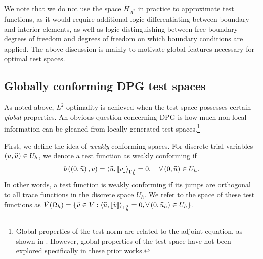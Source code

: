 \begin{remark}
We note that we do not use the space $\tilde{H}_{A^*}$ in practice to approximate test functions, as it would require additional logic differentiating between boundary and interior elements, as well as logic distinguishing between free boundary degrees of freedom and degrees of freedom on which boundary conditions are applied. The above discussion is mainly to motivate global features necessary for optimal test spaces.
\end{remark}

\subsection{Globally conforming DPG test spaces}

As noted above, $L^2$ optimality is achieved when the test space possesses certain \textit{global} properties.  An obvious question concerning DPG is how much non-local information can be gleaned from locally generated test spaces.\footnote{Global properties of the test norm are related to the adjoint equation, as shown in \cite{DPGrobustness}.  However, global properties of the test space have not been explored specifically in these prior works.}

First, we define the idea of \textit{weakly} conforming spaces.  For discrete trial variables $\LRp{u,\uh} \in U_h$, we denote a test function as weakly conforming if
\[
b\LRp{\LRp{0,\uh},v} = \LRa{\uh,\jump{v}}_{\Gh^0} = 0, \quad \forall \LRp{0,\uh} \in U_h.
\]
In other words, a test function is weakly conforming if its jumps are orthogonal to all trace functions in the discrete space $U_h$.  We refer to the space of these test functions as $\tilde{V}(\Oh) = \{\tilde{v}\in V: \LRa{\uh,\jump{\tilde{v}}}_{\Gh^0} = 0, \forall \LRp{0,\uh_h}\in U_h\}$.

